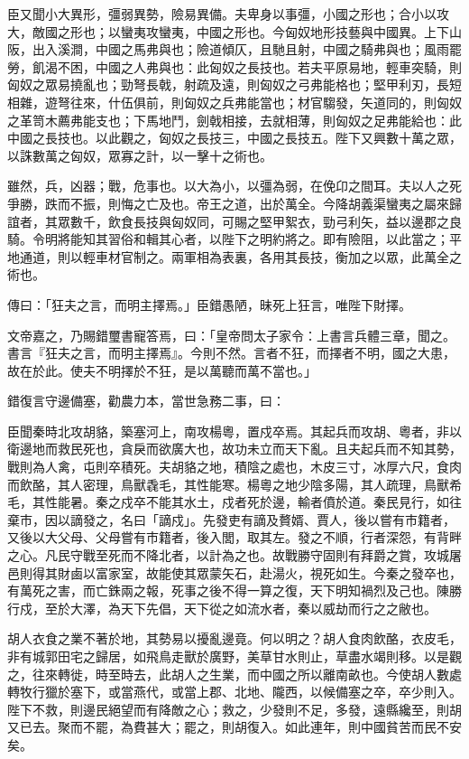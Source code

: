 \begin{pinyinscope}
臣又聞小大異形，彊弱異勢，險易異備。夫卑身以事彊，小國之形也；合小以攻大，敵國之形也；以蠻夷攻蠻夷，中國之形也。今匈奴地形技藝與中國異。上下山阪，出入溪澗，中國之馬弗與也；險道傾仄，且馳且射，中國之騎弗與也；風雨罷勞，飢渴不困，中國之人弗與也：此匈奴之長技也。若夫平原易地，輕車突騎，則匈奴之眾易撓亂也；勁弩長戟，射疏及遠，則匈奴之弓弗能格也；堅甲利刃，長短相雜，遊弩往來，什伍俱前，則匈奴之兵弗能當也；材官騶發，矢道同的，則匈奴之革笥木薦弗能支也；下馬地鬥，劍戟相接，去就相薄，則匈奴之足弗能給也：此中國之長技也。以此觀之，匈奴之長技三，中國之長技五。陛下又興數十萬之眾，以誅數萬之匈奴，眾寡之計，以一擊十之術也。

雖然，兵，凶器；戰，危事也。以大為小，以彊為弱，在俛卬之間耳。夫以人之死爭勝，跌而不振，則悔之亡及也。帝王之道，出於萬全。今降胡義渠蠻夷之屬來歸誼者，其眾數千，飲食長技與匈奴同，可賜之堅甲絮衣，勁弓利矢，益以邊郡之良騎。令明將能知其習俗和輯其心者，以陛下之明約將之。即有險阻，以此當之；平地通道，則以輕車材官制之。兩軍相為表裏，各用其長技，衡加之以眾，此萬全之術也。

傳曰：「狂夫之言，而明主擇焉。」臣錯愚陋，昧死上狂言，唯陛下財擇。

文帝嘉之，乃賜錯璽書寵答焉，曰：「皇帝問太子家令：上書言兵體三章，聞之。書言『狂夫之言，而明主擇焉』。今則不然。言者不狂，而擇者不明，國之大患，故在於此。使夫不明擇於不狂，是以萬聽而萬不當也。」

錯復言守邊備塞，勸農力本，當世急務二事，曰：

臣聞秦時北攻胡貉，築塞河上，南攻楊粵，置戍卒焉。其起兵而攻胡、粵者，非以衛邊地而救民死也，貪戾而欲廣大也，故功未立而天下亂。且夫起兵而不知其勢，戰則為人禽，屯則卒積死。夫胡貉之地，積陰之處也，木皮三寸，冰厚六尺，食肉而飲酪，其人密理，鳥獸毳毛，其性能寒。楊粵之地少陰多陽，其人疏理，鳥獸希毛，其性能暑。秦之戍卒不能其水土，戍者死於邊，輸者僨於道。秦民見行，如往棄市，因以謫發之，名曰「謫戍」。先發吏有謫及贅婿、賈人，後以嘗有市籍者，又後以大父母、父母嘗有市籍者，後入閭，取其左。發之不順，行者深怨，有背畔之心。凡民守戰至死而不降北者，以計為之也。故戰勝守固則有拜爵之賞，攻城屠邑則得其財鹵以富家室，故能使其眾蒙矢石，赴湯火，視死如生。今秦之發卒也，有萬死之害，而亡銖兩之報，死事之後不得一算之復，天下明知禍烈及己也。陳勝行戍，至於大澤，為天下先倡，天下從之如流水者，秦以威劫而行之之敝也。

胡人衣食之業不著於地，其勢易以擾亂邊竟。何以明之？胡人食肉飲酪，衣皮毛，非有城郭田宅之歸居，如飛鳥走獸於廣野，美草甘水則止，草盡水竭則移。以是觀之，往來轉徙，時至時去，此胡人之生業，而中國之所以離南畝也。今使胡人數處轉牧行獵於塞下，或當燕代，或當上郡、北地、隴西，以候備塞之卒，卒少則入。陛下不救，則邊民絕望而有降敵之心；救之，少發則不足，多發，遠縣纔至，則胡又已去。聚而不罷，為費甚大；罷之，則胡復入。如此連年，則中國貧苦而民不安矣。


\end{pinyinscope}
